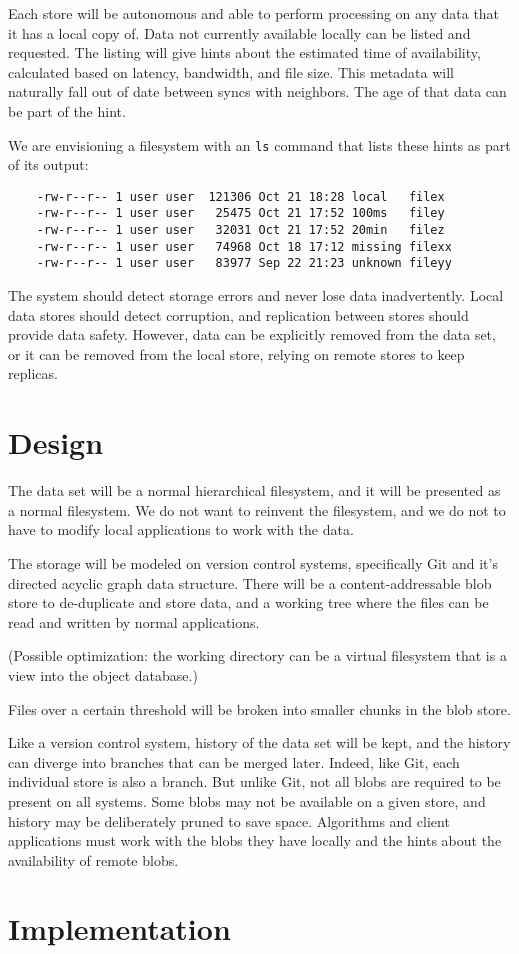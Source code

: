 \documentclass[a4paper]{article}
\begin{document}
Each store will be autonomous and able to perform processing on any data that it
has a local copy of. Data not currently available locally can be listed and
requested. The listing will give hints about the estimated time of availability,
calculated based on latency, bandwidth, and file size. This metadata will
naturally fall out of date between syncs with neighbors. The age of that data
can be part of the hint.

We are envisioning a filesystem with an \lstinline{ls} command that lists these
hints as part of its output:

\begin{lstlisting}
    -rw-r--r-- 1 user user  121306 Oct 21 18:28 local   filex
    -rw-r--r-- 1 user user   25475 Oct 21 17:52 100ms   filey
    -rw-r--r-- 1 user user   32031 Oct 21 17:52 20min   filez
    -rw-r--r-- 1 user user   74968 Oct 18 17:12 missing filexx
    -rw-r--r-- 1 user user   83977 Sep 22 21:23 unknown fileyy
\end{lstlisting}

The system should detect storage errors and never lose data inadvertently. Local
data stores should detect corruption, and replication between stores should
provide data safety. However, data can be explicitly removed from the data set,
or it can be removed from the local store, relying on remote stores to keep
replicas.


\section{Design}\label{design}

The data set will be a normal hierarchical filesystem, and it will be presented
as a normal filesystem. We do not want to reinvent the filesystem, and we do not
to have to modify local applications to work with the data.

The storage will be modeled on version control systems, specifically Git and
it's directed acyclic graph data structure. There will be a content-addressable
blob store to de-duplicate and store data, and a working tree where the files
can be read and written by normal applications.

(Possible optimization: the working directory can be a virtual filesystem that
is a view into the object database.)

Files over a certain threshold will be broken into smaller chunks in the blob
store.

Like a version control system, history of the data set will be kept, and the
history can diverge into branches that can be merged later. Indeed, like Git,
each individual store is also a branch. But unlike Git, not all blobs are
required to be present on all systems. Some blobs may not be available on a
given store, and history may be deliberately pruned to save space. Algorithms
and client applications must work with the blobs they have locally and the hints
about the availability of remote blobs.


\section{Implementation}\label{implementation}




% 
% 
\end{document}
